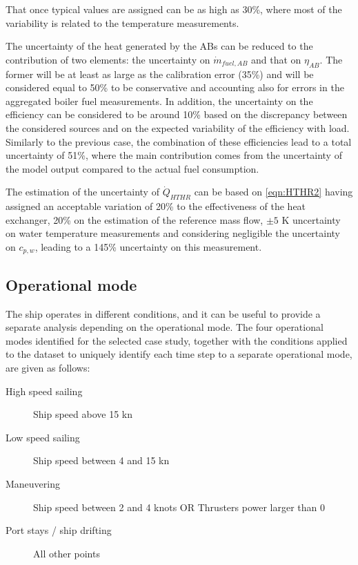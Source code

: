 \documentclass[preprint,12pt]{elsarticle}
\begin{document}
That once typical values are assigned can be as high as 30\%, where most of the variability is related to the temperature measurements.

The uncertainty of the heat generated by the ABs can be reduced to the contribution of two elements: the uncertainty on $\dot{m}_{fuel,AB}$ and that on $\eta_{AB}$. The former will be at least as large as the calibration error (35\%) and will be considered equal to 50\% to be conservative and accounting also for errors in the aggregated boiler fuel measurements. In addition, the uncertainty on the efficiency can be considered to be around 10\% based on the discrepancy between the considered sources and on the expected variability of the efficiency with load. Similarly to the previous case, the combination of these efficiencies lead to a total uncertainty of 51\%, where the main contribution comes from the uncertainty of the model output compared to the actual fuel consumption.

The estimation of the uncertainty of $\dot{Q}_{HTHR}$ can be based on \ref{eqn:HTHR2} having assigned an acceptable variation of 20\% to the effectiveness of the heat exchanger, 20\% on the estimation of the reference mass flow, $\pm 5$ K uncertainty on water temperature measurements and considering negligible the uncertainty on $c_{p,w}$, leading to a 145\% uncertainty on this measurement. 


\subsection{Operational mode}

The ship operates in different conditions, and it can be useful to provide a separate analysis depending on the operational mode. The four operational modes identified for the selected case study, together with the conditions applied to the dataset to uniquely identify each time step to a separate operational mode, are given as follows:
\begin{description}
	\item[High speed sailing] Ship speed above 15 kn
	\item[Low speed sailing] Ship speed between 4 and 15 kn
	\item[Maneuvering] Ship speed between 2 and 4 knots OR Thrusters power larger than 0
	\item[Port stays / ship drifting] All other points
\end{description}
\end{document}
